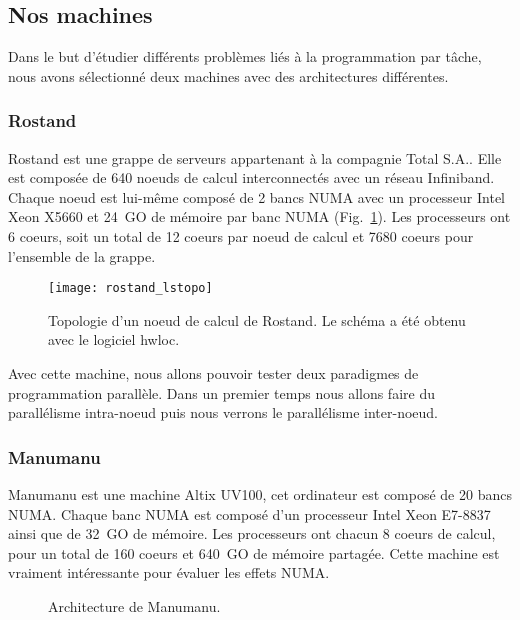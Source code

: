 \subsection{Nos machines}
Dans le but d'étudier différents problèmes liés à la programmation par tâche, nous avons sélectionné deux machines avec des architectures différentes.

\subsubsection{Rostand}
Rostand est une grappe de serveurs appartenant à la compagnie Total S.A..
%
Elle est composée de 640 noeuds de calcul interconnectés avec un réseau Infiniband.
%
Chaque noeud est lui-même composé de 2 bancs NUMA avec un processeur Intel Xeon X5660 et 24~GO de mémoire par banc NUMA (Fig.~\ref{fig:rostand}).
%
Les processeurs ont 6 coeurs, soit un total de 12 coeurs par noeud de calcul et 7680 coeurs pour l'ensemble de la grappe.

\begin{figure}[!ht]
        \centering
        \texttt{[image: rostand\_lstopo]}
        \caption{Topologie d'un noeud de calcul de Rostand. Le schéma a été obtenu avec le logiciel hwloc.}
        \label{fig:rostand}
\end{figure}

Avec cette machine, nous allons pouvoir tester deux paradigmes de programmation parallèle.
%
Dans un premier temps nous allons faire du parallélisme intra-noeud puis nous verrons le parallélisme inter-noeud.

\subsubsection{Manumanu}
Manumanu est une machine Altix UV100, cet ordinateur est composé de 20 bancs NUMA.
%
Chaque banc NUMA est composé d'un processeur Intel Xeon E7-8837 ainsi que de 32~GO de mémoire.
%
Les processeurs ont chacun 8 coeurs de calcul, pour un total de 160 coeurs et 640~GO de mémoire partagée.
%
Cette machine est vraiment intéressante pour évaluer les effets NUMA.

\begin{figure}[!ht]
     \begin{center}
    \end{center}
    \caption{Architecture de Manumanu.}
    \label{fig:manumanu}
\end{figure}

